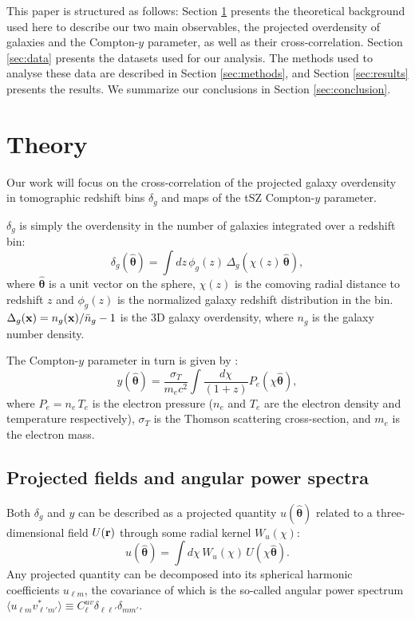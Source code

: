 \documentclass[useAMS,usenatbib]{mn2e}
\newcommand{\nv}{\hat{\boldsymbol{\theta}}}
\begin{document}
  This paper is structured as follows: Section \ref{sec:theory} presents the theoretical background used here to describe our two main observables, the projected overdensity of galaxies and the Compton-$y$ parameter, as well as their cross-correlation. Section \ref{sec:data} presents the datasets used for our analysis. The methods used to analyse these data are described in Section \ref{sec:methods}, and Section \ref{sec:results} presents the results. We summarize our conclusions in Section \ref{sec:conclusion}.

\section{Theory}\label{sec:theory}
  Our work will focus on the cross-correlation of the projected galaxy overdensity in tomographic redshift bins $\delta_g$ and maps of the tSZ Compton-$y$ parameter.
    
  $\delta_g$ is simply the overdensity in the number of galaxies integrated over a redshift bin:
  \begin{equation}
    \delta_g(\nv)=\int dz\,\phi_g(z)\,\Delta_g(\chi(z)\,\nv),
  \end{equation}
  where $\nv$ is a unit vector on the sphere, $\chi(z)$ is the comoving radial distance to redshift $z$ and $\phi_g(z)$ is the normalized galaxy redshift distribution in the bin. $\Delta_g({\bf x})=n_g({\bf x})/\bar{n}_g-1$ is the 3D galaxy overdensity, where $n_g$ is the galaxy number density.
    
  The Compton-$y$ parameter in turn is given by \citep{1972CoASP...4..173S}:
  \begin{equation}
    y(\nv)=\frac{\sigma_T}{m_ec^2}\int \frac{d\chi}{(1+z)} P_e(\chi\nv),
  \end{equation}
  where $P_e=n_e\,T_e$ is the electron pressure ($n_e$ and $T_e$ are the electron density and temperature respectively), $\sigma_T$ is the Thomson scattering cross-section, and $m_e$ is the electron mass.
    
  \subsection{Projected fields and angular power spectra}\label{ssec:theory.cls}    
    Both $\delta_g$ and $y$ can be described as a projected quantity $u(\nv)$ related to a three-dimensional field $U({\bf r})$ through some radial kernel $W_u(\chi)$:
    \begin{equation}
      u(\nv)=\int d\chi\,W_u(\chi)\,U(\chi\nv).
    \end{equation}
    Any projected quantity can be decomposed into its spherical harmonic coefficients $u_{\ell m}$, the covariance of which is the so-called angular power spectrum $\langle u_{\ell m}v^*_{\ell' m'}\rangle\equiv C^{uv}_\ell\delta_{\ell\ell'}\delta_{mm'}$.
\end{document}
